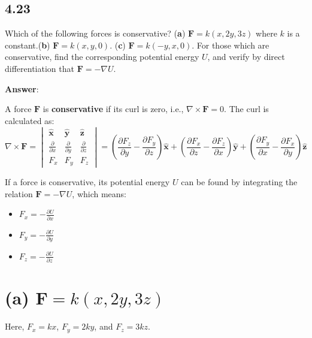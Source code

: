 \documentclass[11pt, a4paper]{article} %
\begin{document}
\newpage
\subsection*{4.23}

Which of the following forces is conservative? (\textbf{a}) $\mathbf{F} = k(x, 2y, 3z)$ where $k$ is a constant.(\textbf{b}) $\mathbf{F} = k(x,y,0)$. (\textbf{c}) $\mathbf{F} = k(-y,x,0)$. For those which are conservative, find the corresponding potential energy $U$, and verify by direct differentiation that $\mathbf{F} = - \nabla U$.

\textbf{Answer}:

A force $\mathbf{F}$ is \textbf{conservative} if its curl is zero, i.e., $\nabla \times \mathbf{F} = 0$. The curl is calculated as:
$$ \nabla \times \mathbf{F} = \begin{vmatrix}
\hat{\mathbf{x}} & \hat{\mathbf{y}} & \hat{\mathbf{z}} \\
\frac{\partial}{\partial x} & \frac{\partial}{\partial y} & \frac{\partial}{\partial z} \\
F_x & F_y & F_z
\end{vmatrix} = \left( \frac{\partial F_z}{\partial y} - \frac{\partial F_y}{\partial z} \right) \hat{\mathbf{x}} + \left( \frac{\partial F_x}{\partial z} - \frac{\partial F_z}{\partial x} \right) \hat{\mathbf{y}} + \left( \frac{\partial F_y}{\partial x} - \frac{\partial F_x}{\partial y} \right) \hat{\mathbf{z}} $$

If a force is conservative, its potential energy $U$ can be found by integrating the relation $\mathbf{F} = -\nabla U$, which means:
\begin{itemize}
    \item $F_x = -\frac{\partial U}{\partial x}$
    \item $F_y = -\frac{\partial U}{\partial y}$
    \item $F_z = -\frac{\partial U}{\partial z}$
\end{itemize}

\hrulefill

\section*{(a) $\mathbf{F} = k(x, 2y, 3z)$}

Here, $F_x = kx$, $F_y = 2ky$, and $F_z = 3kz$.
\end{document}
